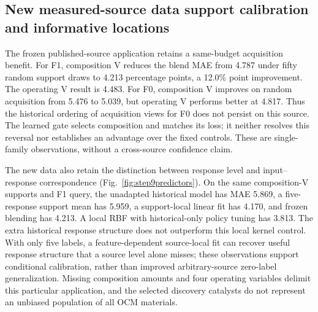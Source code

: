 \subsection{New measured-source data support calibration and informative locations}
The frozen published-source application retains a same-budget acquisition benefit. For F1, composition V reduces the blend MAE from 4.787 under fifty random support draws to 4.213 percentage points, a 12.0\% point improvement. The operating V result is 4.483. For F0, composition V improves on random acquisition from 5.476 to 5.039, but operating V performs better at 4.817. Thus the historical ordering of acquisition views for F0 does not persist on this source. The learned gate selects composition and matches its loss; it neither resolves this reversal nor establishes an advantage over the fixed controls. These are single-family observations, without a cross-source confidence claim.

The new data also retain the distinction between response level and input--response correspondence (Fig.~\ref{fig:step9predictors}). On the same composition-V supports and F1 query, the unadapted historical model has MAE 5.869, a five-response support mean has 5.959, a support-local linear fit has 4.170, and frozen blending has 4.213. A local RBF with historical-only policy tuning has 3.813. The extra historical response structure does not outperform this local kernel control. With only five labels, a feature-dependent source-local fit can recover useful response structure that a source level alone misses; these observations support conditional calibration, rather than improved arbitrary-source zero-label generalization. Missing composition amounts and four operating variables delimit this particular application, and the selected discovery catalysts do not represent an unbiased population of all OCM materials.


